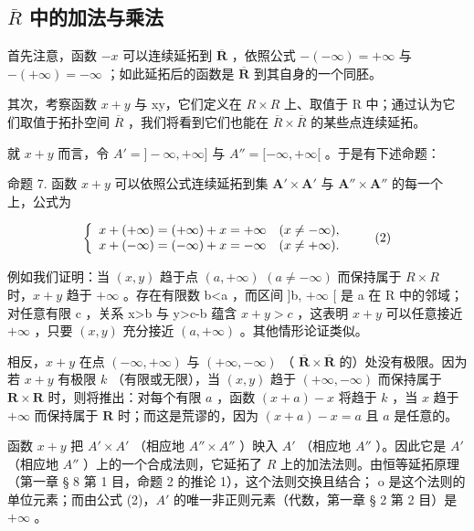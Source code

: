 \subsection{\texorpdfstring{\(\bar{R}\) 中的加法与乘法}{\textbackslash bar\{R\} 中的加法与乘法}}

首先注意，函数 \(-x\) 可以连续延拓到 \(\overline{\mathbf{R}}\) ，依照公式 \(-(-\infty)=+\infty\) 与 \(-(+\infty)=-\infty\) ；如此延拓后的函数是 \(\overline{\mathbf{R}}\) 到其自身的一个同胚。

其次，考察函数 \(x + y\) 与 xy，它们定义在 \(R \times R\) 上、取值于 R 中；通过认为它们取值于拓扑空间 \(\overline{R}\) ，我们将看到它们也能在 \(\overline{R} \times \overline{R}\) 的某些点连续延拓。

就 \(x + y\) 而言，令 \(A' = ] - \infty, + \infty]\) 与 \(A'' = [-\infty, + \infty[\) 。于是有下述命题：

命题 7. 函数 \(x + y\) 可以依照公式连续延拓到集 \(\mathbf{A}' \times \mathbf{A}'\) 与 \(\mathbf{A}'' \times \mathbf{A}''\) 的每一个上，公式为

\[
\left\{ \begin{array}{l l} x + (+ \infty) = (+ \infty) + x = + \infty & (x \neq - \infty), \\ x + (- \infty) = (- \infty) + x = - \infty & (x \neq + \infty). \end{array} \right.\tag{2}
\]

例如我们证明：当 \((x,y)\) 趋于点 \((a,+\infty)\) \((a\neq-\infty)\) 而保持属于 \(R\times R\) 时，\(x+y\) 趋于 \(+\infty\) 。存在有限数 b\textless a ，而区间 {]}b, \(+\infty\) {[} 是 a 在 R 中的邻域；对任意有限 c ，关系 x\textgreater b 与 y\textgreater c-b 蕴含 \(x+y>c\) ，这表明 \(x+y\) 可以任意接近 \(+\infty\) ，只要 \((x,y)\) 充分接近 \((a,+\infty)\) 。其他情形论证类似。

相反，\(x + y\) 在点 \((-\infty, +\infty)\) 与 \((+\infty, -\infty)\) （ \(\overline{\mathbf{R}} \times \overline{\mathbf{R}}\) 的）处没有极限。因为若 \(x + y\) 有极限 \(k\) （有限或无限），当 \((x, y)\) 趋于 \((+\infty, -\infty)\) 而保持属于 \(\mathbf{R} \times \mathbf{R}\) 时，则将推出：对每个有限 \(a\) ，函数 \((x + a) - x\) 将趋于 \(k\) ，当 \(x\) 趋于 \(+\infty\) 而保持属于 \(\mathbf{R}\) 时；而这是荒谬的，因为 \((x + a) - x = a\) 且 \(a\) 是任意的。

函数 \(x + y\) 把 \(A' \times A'\) （相应地 \(A'' \times A''\) ）映入 \(A'\) （相应地 \(A''\) ）。因此它是 \(A'\) （相应地 \(A''\) ）上的一个合成法则，它延拓了 \(R\) 上的加法法则。由恒等延拓原理（第一章 § 8 第 1 目，命题 2 的推论 1），这个法则交换且结合； o 是这个法则的单位元素；而由公式 (2)，\(A'\) 的唯一非正则元素（代数，第一章 § 2 第 2 目）是 \(+\infty\) 。

